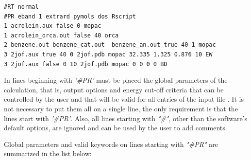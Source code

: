 \documentclass[a4paper,11pt]{refart}
\begin{document}
\hspace*{-\leftmarginwidth}
\begin{minipage}{\fullwidth}
	\begin{lstlisting}[caption=Input example for the last version,label={ls.pri2}]
#RT normal 
#PR eband 1 extrard pymols dos Rscript
1 acrolein.aux false 0 mopac 
1 acrolein_orca.out false 40 orca 
2 benzene.out benzene_cat.out  benzene_an.out true 40 1 mopac
3 2jof.aux true 40 0 2jof.pdb mopac 32.335 1.325 0.876 10 EW 
3 2jof.aux false 0 10 2jof.pdb mopac 0 0 0 0 BD
	\end{lstlisting}
\end{minipage}

In lines beginning with \emph{'\#PR'} must be placed the global parameters of the calculation, that is, output options and energy cut-off criteria that can be controlled by the user and that will be valid for all entries of the input file . It is not necessary to put them all on a single line, the only requirement is that the lines start with \emph{'\#PR'}. Also, all lines starting with \emph{"\#"}, other than the software's default options, are ignored and can be used by the user to add comments.

Global parameters and valid keywords on lines starting with \emph{"\#PR"} are summarized in the list below:
\end{document}
